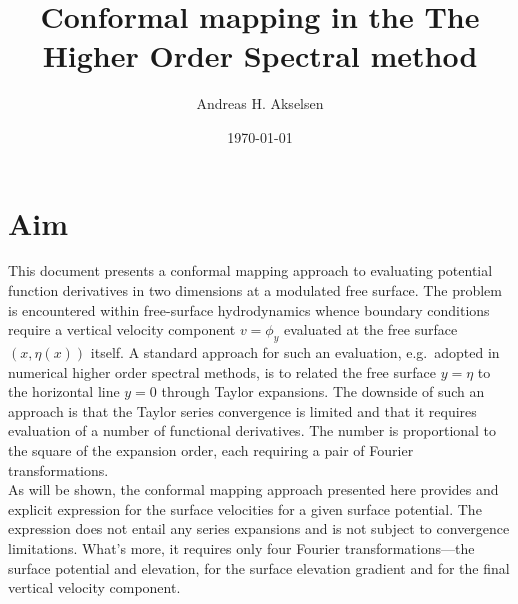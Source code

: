 \documentclass[a4paper,12pt]{article}
\renewcommand{\_}[1]{_\mr{#1}}
\newcommand{\x}{x}
\newcommand{\y}{y}
\newcommand{\surf}{\eta}
\begin{document}
\title{Conformal mapping in the The Higher Order Spectral method}
\author{Andreas H. Akselsen}
\date{\today}
\maketitle


\section{Aim}
This document presents a conformal mapping approach to evaluating potential function derivatives in two dimensions at a modulated free surface.
The problem is encountered within free-surface hydrodynamics whence boundary conditions require a vertical velocity component $v=\phi_y$ evaluated at the free surface $(\x,\surf(\x))$ itself.
A standard approach for such an evaluation, e.g.\ adopted in numerical higher order spectral methods, is to related the free surface $\y=\surf$ to the horizontal line $\y=0$ through Taylor expansions.
The downside of such an approach is that the Taylor series convergence is limited \citep{west1981deep} and that it requires evaluation of a number of functional derivatives.
The number is proportional to the square of the expansion order, each requiring a pair of Fourier transformations.
\\

As will be shown, the conformal mapping approach presented here provides and explicit expression for the surface velocities for a given surface potential.
The expression does not entail any series expansions and is not subject to convergence limitations.
What's more, it requires only four Fourier transformations---the surface potential and elevation, for the surface elevation gradient and for the final vertical velocity component.
\end{document}
